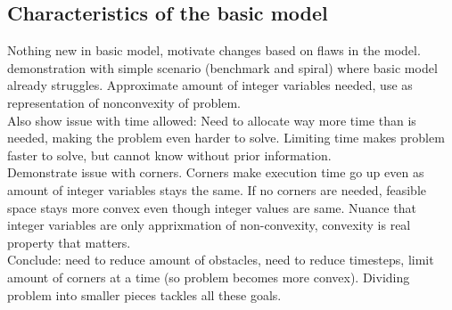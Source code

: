\subsection{Characteristics of the basic model}
Nothing new in basic model, motivate changes based on flaws in the model. demonstration with simple scenario (benchmark and spiral) where basic model already struggles. Approximate amount of integer variables needed, use as representation of nonconvexity of problem. \\
Also show issue with time allowed: Need to allocate way more time than is needed, making the problem even harder to solve. Limiting time makes problem faster to solve, but cannot know without prior information.\\
Demonstrate issue with corners. Corners make execution time go up even as amount of integer variables stays the same. If no corners are needed, feasible space stays more convex even though integer values are same. Nuance that integer variables are only apprixmation of non-convexity, convexity is real property that matters.\\
Conclude: need to reduce amount of obstacles, need to reduce timesteps, limit amount of corners at a time (so problem becomes more convex). Dividing problem into smaller pieces tackles all these goals.
